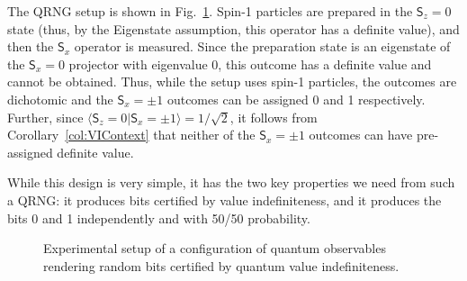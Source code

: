 \documentclass[%
 preprint,
 showpacs,
 showkeys,
 amsmath,
 amssymb,
 aps,
 pra,
 ]{revtex4-1}
\theoremstyle{definition}
\newcommand{\iprod}[2]{\langle #1 | #2 \rangle}
\begin{document}
The QRNG setup is shown in Fig.~\ref{fig:setup}.
Spin-1 particles are prepared in the $\textsf{S}_z=0$ state (thus, by the Eigenstate assumption, this operator has a definite value), and then the $\textsf{S}_x$ operator is measured.
Since the preparation state is an eigenstate of the $\textsf{S}_x=0$ projector with eigenvalue 0, this outcome has a definite value and cannot be obtained.
Thus, while the setup uses spin-1 particles, the outcomes are dichotomic and the $\textsf{S}_x=\pm 1$ outcomes can be assigned 0 and 1 respectively.
Further, since $\iprod{\textsf{S}_z=0}{\textsf{S}_x=\pm 1}=1/\sqrt{2}$, it follows from Corollary~\ref{col:VIContext} that neither of the $\textsf{S}_x=\pm 1$ outcomes can have pre-assigned definite value.

While this design is very simple, it has the two key properties we need from such a QRNG: it produces bits certified by value indefiniteness, and it produces the bits 0 and 1 independently and with 50/50 probability.


\begin{figure}

\begin{center}
\end{center}
\caption{Experimental setup of a configuration of quantum observables rendering random bits certified by quantum value indefiniteness.}
	\label{fig:setup}
\end{figure}
\end{document}
